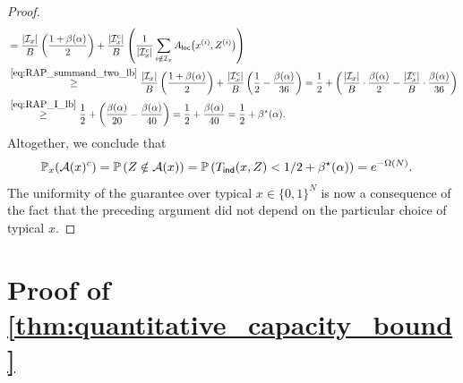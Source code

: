 \documentclass[11pt]{amsart}
\numberwithin{equation}{section}
\numberwithin{equation}{section}
\newcommand{\1}{\mathbbm{1}}
\newcommand{\Prob}{\mathbb{P}}
\newcommand{\ind}{\textup{\textsf{ind}}}
\newcommand{\loc}{\textup{\textsf{loc}}}
\theoremstyle{definition}
\begin{document}
\begin{appendices}
\begin{proof}
\begin{align*}
        & = \frac{|\mathcal I_x|}{B}\left( \frac{1+\beta(\alpha)}{2} \right) + \frac{|\mathcal I_x^c|}{B}\left( \frac{1}{|\mathcal I_x^c|} \sum_{i \notin \mathcal I_x} A_\loc\big(x^{(i)}, Z^{(i)}\big) \right) \\
        & \stackrel{\eqref{eq:RAP_summand_two_lb}}{\geq} \frac{|\mathcal I_x|}{B}\left( \frac{1+\beta(\alpha)}{2} \right) + \frac{|\mathcal I_x^c|}{B}\left( \frac{1}{2} - \frac{\beta(\alpha)}{36} \right) = \frac{1}{2} + \left( \frac{|\mathcal I_x|}{B} \cdot \frac{\beta(\alpha)}{2} - \frac{|\mathcal I_x^c|}{B} \cdot \frac{\beta(\alpha)}{36} \right) \\
        & \stackrel{\eqref{eq:RAP_I_lb}}{\geq} \frac{1}{2} + \left( \frac{\beta(\alpha)}{20} - \frac{\beta(\alpha)}{40} \right) = \frac{1}{2} + \frac{\beta(\alpha)}{40} = \frac{1}{2} + \beta^\star(\alpha).
    \end{align*}
    Altogether, we conclude that
    \begin{align*}
        & \Prob_x\!\left( \mathcal A(x)^c \right) = \Prob\left( Z \notin \mathcal A(x) \right) = \Prob\left( T_\ind(x, Z) < 1/2 + \beta^\star(\alpha) \right) = e^{-\Omega(N)}.
    \end{align*}
    The uniformity of the guarantee over typical $x \in \{0,1\}^{N}$ is now a consequence of the fact that the preceding argument did not depend on the particular choice of typical $x$.
\end{proof}

\section{\texorpdfstring{Proof of \cref{thm:quantitative_capacity_bound}}{Proof of Proposition \ref{thm:quantitative_capacity_bound}}} \label{app:quantitative_cap_bd_proof}


\end{appendices}
\end{document}
